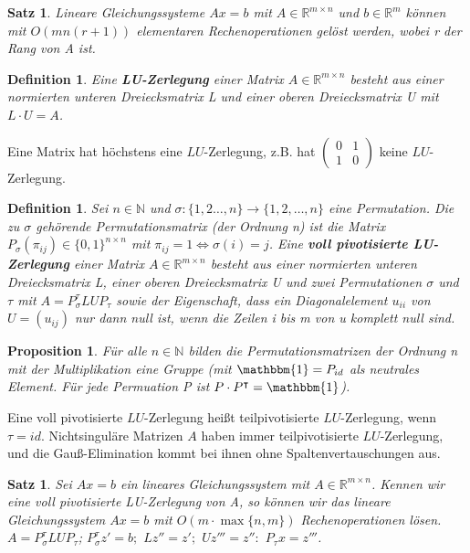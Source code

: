 \documentclass[12pt,a4paper]{article}
\theoremstyle{plain}
\newtheorem{Satz}[Theorem]{Satz}
\newtheorem{Prop}[Theorem]{Proposition}
\newtheorem{Definition}[Theorem]{Definition}
\newcommand{\herv}[1]{{\emph{\textbf{#1}}}}
\newcommand{\N}{\mathbb{N}}
\newcommand{\R}{\mathbb{R}}
\numberwithin{equation}{section}
\begin{document}
\begin{Satz}
Lineare Gleichungssysteme $Ax=b$ mit $A\in \R^{m\times n}$ und $b\in \R^m$ können mit $O(mn(r+1))$ elementaren Rechenoperationen gelöst werden, wobei r der Rang von A ist.
\end{Satz}
\begin{Definition}
Eine \herv{LU-Zerlegung} einer Matrix $A\in \R^{m\times n}$ besteht aus einer normierten unteren Dreiecksmatrix L und einer oberen Dreiecksmatrix U mit $L\cdot U=A$.
\end{Definition}
Eine Matrix hat höchstens eine $LU$-Zerlegung, z.B. hat $\left(\begin{matrix}
0 & 1 \\ 1& 0 \end{matrix}\right)$ keine $LU$-Zerlegung.
\begin{Definition}
Sei $n\in \N$ und $\sigma: \{1,2\ldots,n\} \rightarrow \{1,2,\ldots,n\}$ eine Permutation. Die zu $\sigma$ gehörende Permutationsmatrix (der Ordnung n) ist die Matrix $P_{\sigma}(\pi_{ij})\in\{0,1\}^{n\times n}$ mit $\pi_{ij}=1 \Leftrightarrow \sigma(i)=j$. Eine \herv{voll pivotisierte LU-Zerlegung} einer Matrix $A\in \R^{m\times n}$ besteht aus einer normierten unteren Dreiecksmatrix L, einer oberen Dreiecksmatrix U und zwei Permutationen $\sigma$ und $\tau$ mit $A=P_\sigma^{\tau}LUP_{\tau}$ sowie der Eigenschaft, dass ein Diagonalelement $u_{ii}$ von $U=(u_{ij})$ nur dann null ist, wenn die Zeilen i bis m von u komplett null sind.
\end{Definition}
\begin{Prop}
Für alle $n\in \N$ bilden die Permutationsmatrizen der Ordnung n mit der Multiplikation eine Gruppe (mit $\mathbbm{1}=P_{id}$ als neutrales Element. Für jede Permuation P ist $P\cdot P^{\intercal} =\mathbbm{1}$).
\end{Prop}
Eine voll pivotisierte $LU$-Zerlegung heißt teilpivotisierte $LU$-Zerlegung, wenn $\tau=id$. Nichtsinguläre Matrizen $A$ haben immer teilpivotisierte $LU$-Zerlegung, und die Gauß-Elimination kommt bei ihnen ohne Spaltenvertauschungen aus.
\begin{Satz}
Sei $Ax=b$ ein lineares Gleichungssystem mit $A\in \R^{m\times n}$. Kennen wir eine voll pivotisierte LU-Zerlegung von A, so können wir das lineare Gleichungssystem $Ax=b$ mit $O(m\cdot \max\{n,m\})$ Rechenoperationen lösen.\\
$A=P_{\sigma}^{\tau}LUP_{\tau}$; $P_{\sigma}^{\tau}z'=b;$ $Lz''=z';$ $Uz'''=z'':$ $P_{\tau}x=z'''$.
\end{Satz}
\end{document}
